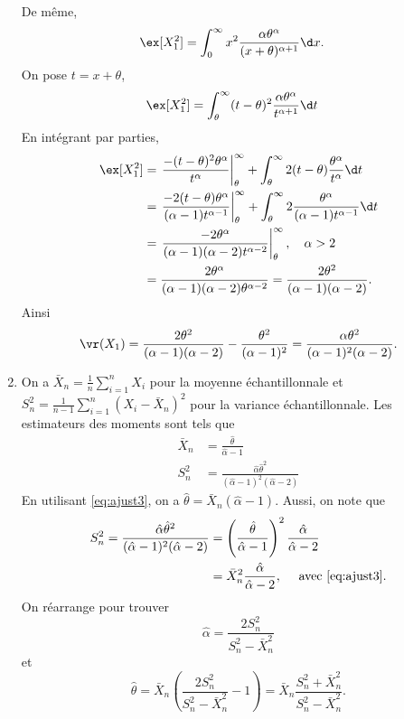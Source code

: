 \begin{exercice}
\begin{sol}
\begin{enumerate}
De même,
\begin{align*}
\ex[X_1^2]&=\int_0^\infty x^2 \frac{\alpha\theta^\alpha}{(x+\theta)^{\alpha+1}}\d x.
\end{align*}
On pose $t=x+\theta$,  
\begin{align*}
\ex[X_1^2]&=\int_\theta^\infty (t-\theta)^2 \frac{\alpha\theta^\alpha}{t^{\alpha+1}}\d t
\end{align*}
En intégrant par parties,
\begin{align*}
\ex[X_1^2]&= \left.\frac{-(t-\theta)^2\theta^\alpha}{t^{\alpha}}\right|_\theta^\infty+ \int_\theta^\infty 2(t-\theta)\frac{\theta^{\alpha}}{ t^{\alpha}}\d t\\
&=\left.\frac{-2(t-\theta)\theta^\alpha}{(\alpha-1)t^{\alpha-1}}\right|_\theta^\infty+ \int_\theta^\infty 2\frac{\theta^{\alpha}}{ (\alpha-1)t^{\alpha-1}}\d t\\
&=\left.\frac{-2\theta^\alpha}{(\alpha-1)(\alpha-2)t^{\alpha-2}}\right|_\theta^\infty, \quad \alpha>2\\
&=\frac{2\theta^\alpha}{(\alpha-1)(\alpha-2)\theta^{\alpha-2}}= \frac{2\theta^2}{(\alpha-1)(\alpha-2)}.
\end{align*}
Ainsi
$$
\vr(X_1)=\frac{2\theta^2}{(\alpha-1)(\alpha-2)}-\frac{\theta^2}{(\alpha-1)^2}=\frac{\alpha\theta^2}{(\alpha-1)^2(\alpha-2)}.
$$

\item On a $\bar X_n=\frac{1}{n}\sum_{i=1}^nX_i$ pour la moyenne échantillonnale et $S_n^2=\frac{1}{n-1}\sum_{i=1}^n(X_i-\bar X_n)^2$ pour la variance échantillonnale. Les estimateurs des moments sont tels que
\begin{align}
\bar X_n &= \frac{\hat\theta}{\hat\alpha-1} \label{eq:ajust3}\\
S_n^2 &= \frac{\hat\alpha\hat\theta^2}{(\hat\alpha-1)^2(\hat\alpha-2)}\label{eq:ajust4}
\end{align}
En utilisant \eqref{eq:ajust3}, on a $\hat\theta=\bar X_n (\hat\alpha -1)$. Aussi, on note que
\begin{align*}
S_n^2= \frac{\hat\alpha\hat\theta^2}{(\hat\alpha-1)^2(\hat\alpha-2)}&= \left(\frac{\hat\theta}{\hat\alpha-1}\right)^2\frac{\hat\alpha}{\hat\alpha-2}\\
& = \bar X_n^2\frac{\hat\alpha}{\hat\alpha-2}, \quad \mbox{ avec \eqref{eq:ajust3}}.
\end{align*}
On réarrange pour trouver
$$
\hat\alpha = \frac{2S_n^2}{S_n^2-\bar X_n^2}
$$
et
$$
\hat\theta=\bar X_n \left(\frac{2S_n^2}{S_n^2-\bar X_n^2} -1\right)=\bar X_n \frac{S_n^2+\bar X_n^2}{S_n^2-\bar X_n^2}.
$$


\end{enumerate}
\end{sol}
\end{exercice}
